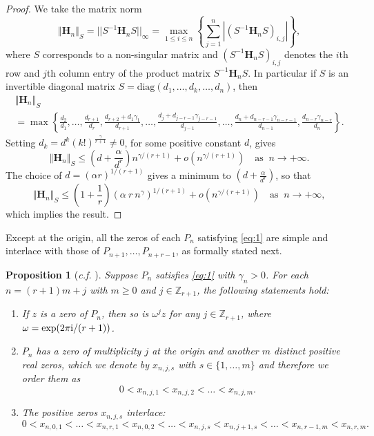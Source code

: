 \documentclass[12pt]{article}
\newtheorem{proposition}{Proposition}[section]
\numberwithin{equation}{section}
\begin{document}
\begin{proof}
We take the matrix norm 
\[
	\left\Vert \mathbf{H}_n \right\Vert_S =|| S^{-1}  \mathbf{H}_n S ||_{\infty} = \max_{1\leq i\leq n} \left\{ \sum_{j=1}^n \left|(S^{-1} \mathbf{H}_n S)_{i,j} \right| \right\}, 
\]
where $S$ corresponds to a non-singular matrix and $(S^{-1} \mathbf{H}_n S)_{i,j}$ denotes the $i$th row and $j$th column entry of the product matrix $S^{-1} \mathbf{H}_n S$. In particular if $S$ is an invertible diagonal matrix   $S = \text{diag}(d_1,\ldots, d_k, \ldots, d_{n})$, then 
\[
\begin{multlined}
	\left\Vert \mathbf{H}_n \right\Vert_S \\
	= \max \left\{ \tfrac{d_2}{d_1}, \ldots ,  \tfrac{d_{r+1}}{d_r},    \tfrac{d_{r+2} + d_1 \gamma_1}{d_{r+1}}, \ldots, \tfrac{d_j + d_{j-r-1} \gamma_{j-r-1}}{d_{j-1}} , \ldots, 
	\tfrac{d_n + d_{n-r-1} \gamma_{n-r-1}}{d_{n-1}},  \tfrac{ d_{n-r} \gamma_{n-r}}{d_{n}} \right\}. 
\end{multlined}
\]
Setting $d_k= d^{k} (k!)^{\frac{\gamma}{r+1}}\neq 0$, for some  positive constant $d$, gives 
\[
	\left\Vert \mathbf{H}_n \right\Vert_S \leq \left(d+\frac{\alpha}{d^{r}}\right) n^{\gamma/(r+1)} + o(n^{\gamma/(r+1)}) \quad \text{as }\ n\to +\infty. 
\]
The choice of $d=\left(\alpha r\right)^{1/(r+1)}$ gives a minimum to $\left(d+\frac{\alpha}{d^{r}}\right)$, so that  
\[
	\left\Vert \mathbf{H}_n \right\Vert_S \leq  \left( 1 + \frac{1}{r}\right) \left( \alpha\  r \ n^{\gamma} \right)^{1/(r+1)}+ o(n^{\gamma/(r+1)}) \quad \text{as }\ n\to +\infty, 
\]
which implies the result. 
\end{proof}

Except at the origin, all the zeros of each $P_n$ satisfying \eqref{eq:1} are simple and interlace with those of $P_{n+1},\ldots, P_{n+r-1}$, as formally stated next. \\

\begin{proposition}[{\it c.f.} {\cite[Th. 2.2]{BR08}}]
\label{prop:zeros}
Suppose $P_n$ satisfies \eqref{eq:1} with $\gamma_n>0$. For each $n=(r+1)m+j$ with $m\geq0$ and $j\in\mathbb{Z}_{r+1}$, the following statements hold: 
\begin{enumerate}[label={\normalfont(\alph*)}]
\item If $z$ is a zero of $P_n$, then so is $\omega^j z$ for any $j\in\mathbb{Z}_{r+1}$, where $\omega=\exp(2\pi {\rm i}/(r+1))$. 
\item $P_n$ has a zero of multiplicity $j$ at the origin  and another $m$ distinct positive real zeros, which we denote by $x_{n,j,s}$ with $s\in\{1,\ldots , m\}$ and therefore we order them as
\[	
	0< x_{n,j,1} < x_{n,j,2} <\ldots < x_{n,j,m}. 
\]
\item The positive zeros $x_{n,j,s}$ interlace: 
\[
	0 < x_{n,0,1}<\ldots < x_{n,r,1} < x_{n,0,2} < \ldots < x_{n,j,s}<x_{n,j+1,s} < \ldots < x_{n,r-1,m}<x_{n,r,m} . 
\]
\end{enumerate}

\end{proposition}
\end{document}
